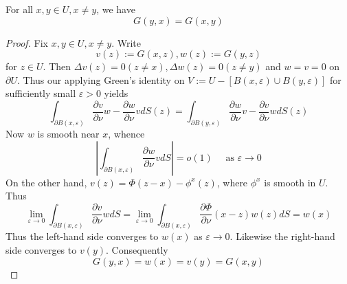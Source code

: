 \begin{theorem}
    For all $x, y \in U, x \neq y$, we have
    \begin{equation*}
        G(y, x)=G(x, y)
    \end{equation*}
    \begin{proof}
        Fix $x, y \in U, x \neq y$. Write
        \begin{equation*}
            v(z):=G(x, z), w(z):=G(y, z)
        \end{equation*}
        for $z\in U$.
        Then $\Delta v(z)=0(z \neq x), \Delta w(z)=0(z \neq y)$ and $w=v=0$ on $\partial U$. Thus our applying Green's identity on $V:=U-[B(x, \varepsilon) \cup B(y, \varepsilon)]$ for sufficiently small $\varepsilon>0$ yields
        \begin{equation*}
            \int_{\partial B(x, \varepsilon)} \frac{\partial v}{\partial \nu} w-\frac{\partial w}{\partial \nu} v d S(z)=\int_{\partial B(y, \varepsilon)} \frac{\partial w}{\partial \nu} v-\frac{\partial v}{\partial \nu} w d S(z)
        \end{equation*}
        Now $w$ is smooth near $x$, whence
        \begin{equation*}
            \left|\int_{\partial B(x, \varepsilon)} \frac{\partial w}{\partial \nu} v d S\right|
            =
            o(1)
            \quad \text { as } \varepsilon \rightarrow 0
        \end{equation*}
        On the other hand, $v(z)=\Phi(z-x)-\phi^x(z)$, where $\phi^x$ is smooth in $U$. Thus
        \begin{equation*}
            \lim _{\varepsilon \rightarrow 0} \int_{\partial B(x, \varepsilon)} \frac{\partial v}{\partial \nu} w d S=\lim _{\varepsilon \rightarrow 0} \int_{\partial B(x, \varepsilon)} \frac{\partial \Phi}{\partial \nu}(x-z) w(z) d S=w(x)
        \end{equation*}
        Thus the left-hand side converges to $w(x)$ as $\varepsilon \rightarrow 0$. Likewise the right-hand side converges to $v(y)$. Consequently
        \begin{equation*}
            G(y, x)=w(x)=v(y)=G(x, y)
        \end{equation*}
    \end{proof}
\end{theorem}

